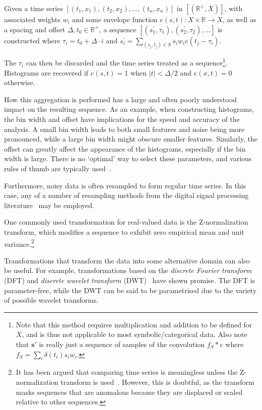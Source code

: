 Given a time series $[(t_1, x_1), (t_2, x_2), \dots, (t_n, x_n)]$ in $[(\mathbb{R}^+, X)]$, with associated weights $w_i$ and some envelope function $e(s, t): X \times \mathbb{R} \rightarrow X$, as well as a spacing and offset $\Delta, t_0 \in \mathbb{R}^+$, a sequence $[(s_{1}^{'}, \tau_1), (s_{2}^{'}, \tau_2), \dots]$ is constructed where $\tau_i = t_0 + \Delta \cdot i$ and $s_{i}^{'} = \sum_{(s_j, t_j) \in S} s_i w_i e(t_j - \tau_i)$.

The $\tau_i$ can then be discarded and the time series treated as a sequence\footnote{Note that this method requires multiplication and addition to be defined for $X$, and is thus not applicable to most symbolic/categorical data. Also note that $\mathbf{s}'$ is really just a sequence of samples of the convolution $f_S \ast e$ where $f_S = \sum_i \delta(t_i) s_i w_i$.}. Histograms are recovered if $e(s, t) = 1$ when $|t| < \Delta/2$ and $e(x, t) = 0$ otherwise.

How this aggregation is performed has a large and often poorly understood impact on the resulting sequence. As an example, when constructing histograms, the bin width and offset have implications for the speed and accuracy of the analysis. A small bin width leads to both small features and noise being more pronounced, while a large bin width might obscure smaller features. Similarly, the offset can greatly affect the appearance of the histograms, especially if the bin width is large. There is no `optimal' way to select these parameters, and various rules of thumb are typically used~\cite{density_estimation}.

Furthermore, noisy data is often resampled to form regular time series. In this case, any of a number of resampling methods from the digital signal processing literature~\cite{TODO} may be employed.

One commonly used transformation for real-valued data is the Z-normalization transform, which modifies a sequence to exhibit zero empirical mean and unit variance.\footnote{It has been argued that comparing time series is meaningless unless the Z-normalization transform is used~\cite{keogh5}. However, this is doubtful, as the transform masks sequences that are anomalous because they are displaced or scaled relative to other sequences.}

Transformations that transform the data into some alternative domain can also be useful. For example, transformations based on the \emph{discrete Fourier transform} (DFT) and \emph{discrete wavelet transform} (DWT)~\cite{fu} have shown promise. The DFT is parameter-free, while the DWT can be said to be parametrised due to the variety of possible wavelet transforms.

